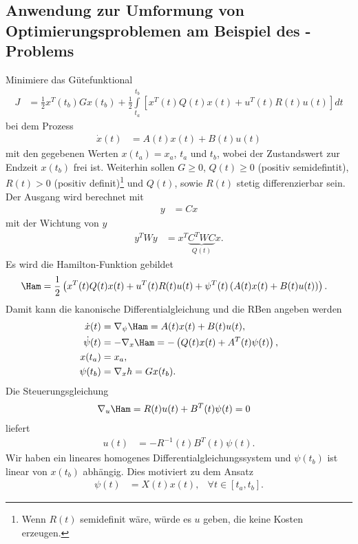 \subsection{Anwendung zur Umformung von Optimierungsproblemen am Beispiel des -Problems}
Minimiere das Gütefunktional
\begin{align*}
	J  & = \frac12 x^T(t_b)Gx(t_b)+\frac12\int\limits_{t_a}^{t_b}\left[x^T(t)Q(t)x(t)+u^T(t)R(t)u(t)\right]dt
\end{align*}
bei dem Prozess 
\begin{align*}
	\dot{x}(t) & = A(t)x(t)+B(t)u(t)
\end{align*}
mit den gegebenen Werten $x(t_a)=x_a$, $t_a$ und $t_b$, wobei der Zustandswert zur Endzeit $x(t_b)$ frei ist. Weiterhin sollen $G\ge 0$,
$Q(t)\ge 0$ (positiv semidefintit), $R(t)>0$ (positiv definit)\footnote{Wenn $R(t)$ semidefinit wäre, würde es $u$ geben, die keine Kosten erzeugen.}
und $Q(t)$, sowie $R(t)$ stetig differenzierbar sein. Der Ausgang wird berechnet mit
\begin{align*}
	y & = C x
\end{align*}
mit der Wichtung von $y$
\begin{align*}
	y^T W y & = x^T\underbrace{C^TWC}_{Q(t)}x.
\end{align*}
Es wird die Hamilton-Funktion gebildet
\begin{align*}
	\Ham & = \frac12\left(x^T(t) Q(t)x(t)+u^T(t)R(t)u(t)+\psi^T(t)\left(A(t)x(t)+B(t)u(t) \right) \right).
\end{align*}
Damit kann die kanonische Differentialgleichung und die \ac{RB}en angeben werden
\begin{align*}
	\dot{x}(t) & = \nabla_{\psi}\Ham = A(t)x(t)+B(t)u(t),\\
	\dot{\psi}(t) & = -\nabla_x\Ham = -\left(Q(t)x(t) + A^T(t)\psi(t) \right),\\
	x(t_a) & = x_a, \\
	\psi(t_b) & = \nabla_x h=G x(t_b).
\end{align*}
Die Steuerungsgleichung 
\begin{align*}
	\nabla_u\Ham & = R(t) u(t) + B^T(t)\psi(t)=0
\end{align*}
liefert
\begin{align*}
	u(t) & = -R^{-1}(t)B^T(t)\psi(t).
\end{align*}
Wir haben ein lineares homogenes Differentialgleichungssystem und $\psi(t_b)$ ist linear von $x(t_b)$ abhängig. Dies motiviert zu dem Ansatz
\begin{align*}
	\psi(t) & = X(t)x(t), & \forall t\in[t_a,t_b].
\end{align*}
